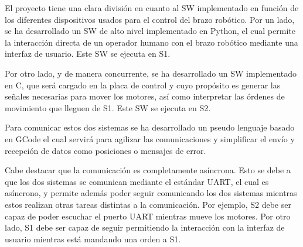 El proyecto tiene una clara división en cuanto al \ac{SW} implementado en función de los diferentes dispositivos usados para el control del brazo robótico. Por un lado, se ha desarrollado un \ac{SW} de alto nivel implementado en Python, el cual permite la interacción directa de un operador humano con el brazo robótico mediante una interfaz de usuario. Este \ac{SW} se ejecuta en \ac{S1}. 

Por otro lado, y de manera concurrente, se ha desarrollado un \ac{SW} implementado en C,  que será cargado en la placa de control y cuyo propósito es generar las señales necesarias para mover los motores, así como interpretar las órdenes de movimiento que lleguen de \ac{S1}. Este \ac{SW} se ejecuta en \ac{S2}.

Para comunicar estos dos sistemas se ha desarrollado un pseudo lenguaje basado en GCode el cual servirá para agilizar las comunicaciones y simplificar el envío y recepción de datos como posiciones o mensajes de error.

Cabe destacar que la comunicación es completamente asíncrona. Esto se debe a que los dos sistemas se comunican mediante el estándar UART, el cual es asíncrono, y permite además poder seguir comunicando los dos sistemas mientras estos realizan otras tareas distintas a la comunicación. Por ejemplo, \ac{S2} debe ser capaz de poder escuchar el puerto UART mientras mueve los motores. Por otro lado, \ac{S1} debe ser capaz de seguir permitiendo la interacción con la interfaz de usuario mientras está mandando una orden a \ac{S1}.
